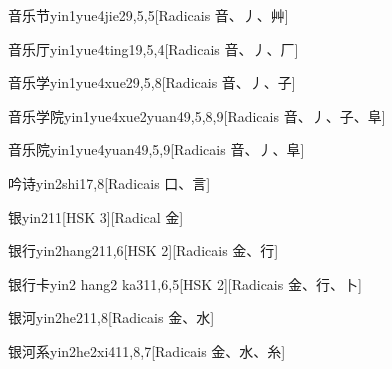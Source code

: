 \begin{entry}{音乐节}{yin1yue4jie2}{9,5,5}[Radicais ⾳、⼃、⾋]
\end{entry}

\begin{entry}{音乐厅}{yin1yue4ting1}{9,5,4}[Radicais ⾳、⼃、⼚]
\end{entry}

\begin{entry}{音乐学}{yin1yue4xue2}{9,5,8}[Radicais ⾳、⼃、⼦]
\end{entry}

\begin{entry}{音乐学院}{yin1yue4xue2yuan4}{9,5,8,9}[Radicais ⾳、⼃、⼦、⾩]
\end{entry}

\begin{entry}{音乐院}{yin1yue4yuan4}{9,5,9}[Radicais ⾳、⼃、⾩]
\end{entry}

\begin{entry}{吟诗}{yin2shi1}{7,8}[Radicais ⼝、⾔]
\end{entry}

\begin{entry}{银}{yin2}{11}[HSK 3][Radical ⾦]
\end{entry}

\begin{entry}{银行}{yin2hang2}{11,6}[HSK 2][Radicais ⾦、⾏]
\end{entry}

\begin{entry}{银行卡}{yin2 hang2 ka3}{11,6,5}[HSK 2][Radicais ⾦、⾏、⼘]
\end{entry}

\begin{entry}{银河}{yin2he2}{11,8}[Radicais ⾦、⽔]
\end{entry}

\begin{entry}{银河系}{yin2he2xi4}{11,8,7}[Radicais ⾦、⽔、⽷]
\end{entry}

